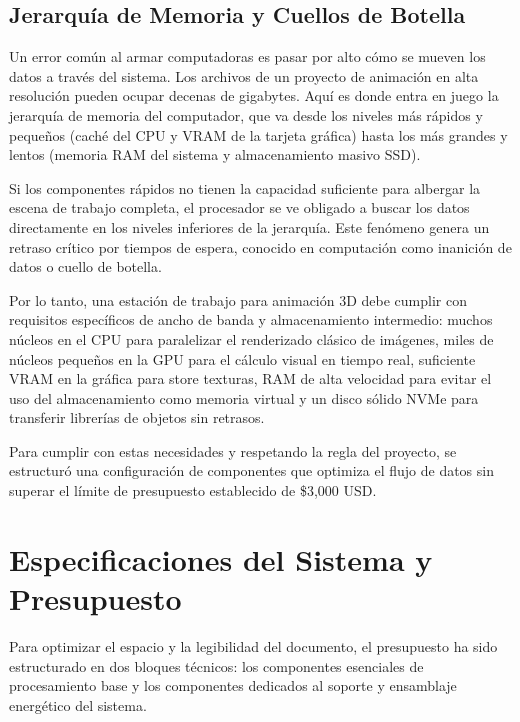 \documentclass[14pt,a4paper]{extarticle}
\begin{document}
\subsection*{\centering Jerarquía de Memoria y Cuellos de Botella}
Un error común al armar computadoras es pasar por alto cómo se mueven los datos a través del sistema. Los archivos de un proyecto de animación en alta resolución pueden ocupar decenas de gigabytes. Aquí es donde entra en juego la jerarquía de memoria del computador, que va desde los niveles más rápidos y pequeños (caché del CPU y VRAM de la tarjeta gráfica) hasta los más grandes y lentos (memoria RAM del sistema y almacenamiento masivo SSD).

Si los componentes rápidos no tienen la capacidad suficiente para albergar la escena de trabajo completa, el procesador se ve obligado a buscar los datos directamente en los niveles inferiores de la jerarquía. Este fenómeno genera un retraso crítico por tiempos de espera, conocido en computación como inanición de datos o cuello de botella. 

Por lo tanto, una estación de trabajo para animación 3D debe cumplir con requisitos específicos de ancho de banda y almacenamiento intermedio: muchos núcleos en el CPU para paralelizar el renderizado clásico de imágenes, miles de núcleos pequeños en la GPU para el cálculo visual en tiempo real, suficiente VRAM en la gráfica para store texturas, RAM de alta velocidad para evitar el uso del almacenamiento como memoria virtual y un disco sólido NVMe para transferir librerías de objetos sin retrasos.

Para cumplir con estas necesidades y respetando la regla del proyecto, se estructuró una configuración de componentes que optimiza el flujo de datos sin superar el límite de presupuesto establecido de \$3,000 USD.

\section*{\centering Especificaciones del Sistema y Presupuesto}

Para optimizar el espacio y la legibilidad del documento, el presupuesto ha sido estructurado en dos bloques técnicos: los componentes esenciales de procesamiento base y los componentes dedicados al soporte y ensamblaje energético del sistema.
\end{document}
